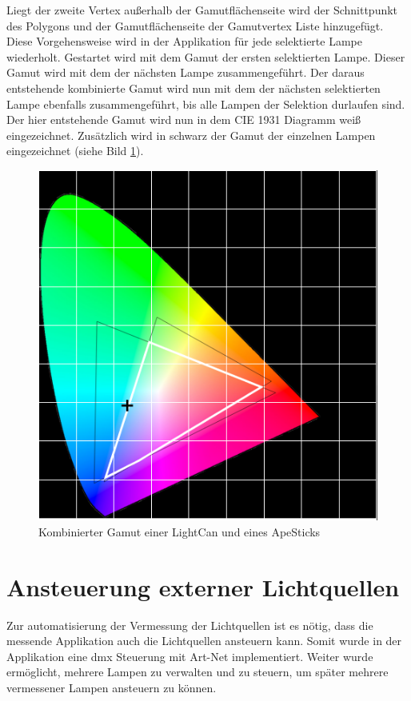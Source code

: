 \documentclass[11pt]{scrartcl}
\begin{document}
\noindent
Liegt der zweite Vertex außerhalb der Gamutflächenseite wird der Schnittpunkt des Polygons und der Gamutflächenseite der Gamutvertex Liste hinzugefügt. Diese Vorgehensweise
wird in der Applikation für jede selektierte Lampe wiederholt. Gestartet wird mit dem Gamut der ersten selektierten Lampe. Dieser Gamut wird mit dem der nächsten Lampe
zusammengeführt. Der daraus entstehende kombinierte Gamut wird nun mit dem der nächsten selektierten Lampe ebenfalls zusammengeführt, bis alle Lampen der Selektion durlaufen
sind. Der hier entstehende Gamut wird nun in dem CIE 1931 Diagramm weiß eingezeichnet. Zusätzlich wird in schwarz der Gamut der einzelnen Lampen eingezeichnet (siehe Bild
\ref{fig:combinedGamut}).
\begin{figure}[H]
    \begin{center}
        \includegraphics[width=.5\textwidth]{images/combined_gamut_lightCan_lightStick.png}
    \end{center}
    \caption{Kombinierter Gamut einer LightCan und eines ApeSticks}\label{fig:combinedGamut}
\end{figure}
\noindent
\clearpage

\section{Ansteuerung externer Lichtquellen}
Zur automatisierung der Vermessung der Lichtquellen ist es nötig, dass die messende Applikation auch die Lichtquellen ansteuern kann. Somit wurde
in der Applikation eine \ac{dmx} Steuerung mit Art-Net implementiert. Weiter wurde ermöglicht, mehrere Lampen zu verwalten und zu steuern, um später mehrere
vermessener Lampen ansteuern zu können.
\end{document}
